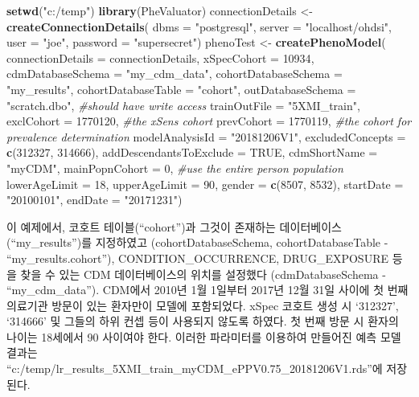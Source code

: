 \documentclass[10.5pt]{book}
\newenvironment{Shaded}{\begin{snugshade}}{\end{snugshade}}
\newcommand{\KeywordTok}[1]{\textcolor[rgb]{0.13,0.29,0.53}{\textbf{#1}}}
\newcommand{\DataTypeTok}[1]{\textcolor[rgb]{0.13,0.29,0.53}{#1}}
\newcommand{\DecValTok}[1]{\textcolor[rgb]{0.00,0.00,0.81}{#1}}
\newcommand{\StringTok}[1]{\textcolor[rgb]{0.31,0.60,0.02}{#1}}
\newcommand{\CommentTok}[1]{\textcolor[rgb]{0.56,0.35,0.01}{\textit{#1}}}
\newcommand{\OtherTok}[1]{\textcolor[rgb]{0.56,0.35,0.01}{#1}}
\newcommand{\NormalTok}[1]{#1}
\theoremstyle{definition}
\theoremstyle{definition}
\theoremstyle{definition}
\theoremstyle{remark}
\begin{document}
\begin{Shaded}
\begin{Highlighting}[]
\KeywordTok{setwd}\NormalTok{(}\StringTok{"c:/temp"}\NormalTok{)}
\KeywordTok{library}\NormalTok{(PheValuator)}
\NormalTok{connectionDetails <-}\StringTok{ }\KeywordTok{createConnectionDetails}\NormalTok{(}
  \DataTypeTok{dbms =} \StringTok{"postgresql"}\NormalTok{,}
  \DataTypeTok{server =} \StringTok{"localhost/ohdsi"}\NormalTok{,}
  \DataTypeTok{user =} \StringTok{"joe"}\NormalTok{,}
  \DataTypeTok{password =} \StringTok{"supersecret"}\NormalTok{)}
\NormalTok{phenoTest <-}\StringTok{ }\KeywordTok{createPhenoModel}\NormalTok{(}
  \DataTypeTok{connectionDetails =}\NormalTok{ connectionDetails,}
  \DataTypeTok{xSpecCohort =} \DecValTok{10934}\NormalTok{,}
  \DataTypeTok{cdmDatabaseSchema =} \StringTok{"my_cdm_data"}\NormalTok{,}
  \DataTypeTok{cohortDatabaseSchema =} \StringTok{"my_results"}\NormalTok{,}
  \DataTypeTok{cohortDatabaseTable =} \StringTok{"cohort"}\NormalTok{,}
  \DataTypeTok{outDatabaseSchema =} \StringTok{"scratch.dbo"}\NormalTok{, }\CommentTok{#should have write access}
  \DataTypeTok{trainOutFile =} \StringTok{"5XMI_train"}\NormalTok{,}
  \DataTypeTok{exclCohort =} \DecValTok{1770120}\NormalTok{, }\CommentTok{#the xSens cohort}
  \DataTypeTok{prevCohort =} \DecValTok{1770119}\NormalTok{, }\CommentTok{#the cohort for prevalence determination}
  \DataTypeTok{modelAnalysisId =} \StringTok{"20181206V1"}\NormalTok{,}
  \DataTypeTok{excludedConcepts =} \KeywordTok{c}\NormalTok{(}\DecValTok{312327}\NormalTok{, }\DecValTok{314666}\NormalTok{),}
  \DataTypeTok{addDescendantsToExclude =} \OtherTok{TRUE}\NormalTok{,}
  \DataTypeTok{cdmShortName =} \StringTok{"myCDM"}\NormalTok{,}
  \DataTypeTok{mainPopnCohort =} \DecValTok{0}\NormalTok{, }\CommentTok{#use the entire person population}
  \DataTypeTok{lowerAgeLimit =} \DecValTok{18}\NormalTok{,}
  \DataTypeTok{upperAgeLimit =} \DecValTok{90}\NormalTok{,}
  \DataTypeTok{gender =} \KeywordTok{c}\NormalTok{(}\DecValTok{8507}\NormalTok{, }\DecValTok{8532}\NormalTok{),}
  \DataTypeTok{startDate =} \StringTok{"20100101"}\NormalTok{,}
  \DataTypeTok{endDate =} \StringTok{"20171231"}\NormalTok{)}
\end{Highlighting}
\end{Shaded}

이 예제에서, 코호트 테이블(``cohort'')과 그것이 존재하는
데이터베이스(``my\_results'')를 지정하였고 (cohortDatabaseSchema,
cohortDatabaseTable - ``my\_results.cohort''), CONDITION\_OCCURRENCE,
DRUG\_EXPOSURE 등을 찾을 수 있는 CDM 데이터베이스의 위치를 설정했다
(cdmDatabaseSchema - ``my\_cdm\_data''). CDM에서 2010년 1월 1일부터
2017년 12월 31일 사이에 첫 번째 의료기관 방문이 있는 환자만이 모델에
포함되었다. xSpec 코호트 생성 시 `312327', `314666' 및 그들의 하위 컨셉
등이 사용되지 않도록 하였다. 첫 번째 방문 시 환자의 나이는 18세에서 90
사이여야 한다. 이러한 파라미터를 이용하여 만들어진 예측 모델 결과는
``c:/temp/lr\_results\_5XMI\_train\_myCDM\_ePPV0.75\_20181206V1.rds''에
저장된다.
\end{document}
